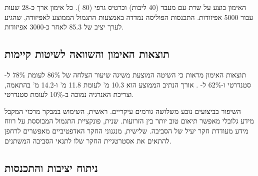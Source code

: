 \begin{table}[htbp]
\centering
\caption{היפרפרמטרים לאימון  מבוזר}
\label{tab:ch06_hyperparameters}
\end{table}

האימון בוצע על שרת עם מעבד  (40 ליבות) וכרטיס גרפי  (80 ). כל אימון ארך כ-28 שעות עבור 5000 אפיזודות. התכנסות הפוליסה נמדדה באמצעות התגמול הממוצע לאפיזודה, שהגיע לערך יציב של 85.3 לאחר כ-3000 אפיזודות.

\subsection{תוצאות האימון והשוואה לשיטות קיימות}
\label{sec:ch06_results}

תוצאות האימון מראות כי השיטה המוצעת משיגה שיעור הצלחה של 86\% לעומת 78\% ל- סטנדרטי \cite{Schulman2017} ו-62\% ל- \cite{Lowe2017}. אורך הנתיב הממוצע הוא 10.3 מ' לעומת 11.8 מ' ו-14.2 מ' בהתאמה, וצריכת האנרגיה נמוכה ב-10\% לעומת  סטנדרטי.

השיפור בביצועים נובע משלושה גורמים עיקריים. ראשית, השימוש במבקר מרכזי המקבל מידע גלובלי מאפשר תיאום טוב יותר בין הזרועות. שנית, פונקציית התגמול המבוססת על רווח מידע  מעודדת חקר יעיל של הסביבה. שלישית, מנגנוני החקר האדפטיביים מאפשרים לרחפן להתאים את אסטרטגיית החקר שלו לתנאי הסביבה המשתנים.

\subsection{ניתוח יציבות והתכנסות}
\label{sec:ch06_convergence}

